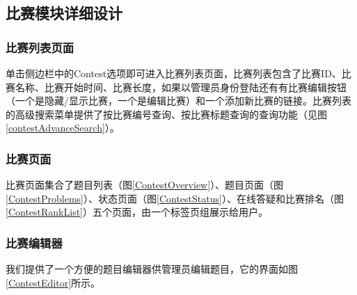 
\subsection{比赛模块详细设计}
\subsubsection{比赛列表页面}

单击侧边栏中的Contest选项即可进入比赛列表页面，比赛列表包含了比赛ID、比赛名称、比赛开始时间、比赛长度，如果以管理员身份登陆还有有比赛编辑按钮（一个是隐藏/显示比赛，一个是编辑比赛）和一个添加新比赛的链接。比赛列表的高级搜索菜单提供了按比赛编号查询、按比赛标题查询的查询功能（见图\ref{contestAdvanceSearch}）。

\subsubsection{比赛页面}
比赛页面集合了题目列表（图\ref{ContestOverview}）、题目页面（图\ref{ContestProblems}）、状态页面（图\ref{ContestStatus}）、在线答疑和比赛排名（图\ref{ContestRankList}）五个页面，由一个标签页组展示给用户。


\subsubsection{比赛编辑器}
我们提供了一个方便的题目编辑器供管理员编辑题目，它的界面如图\ref{ContestEditor}所示。